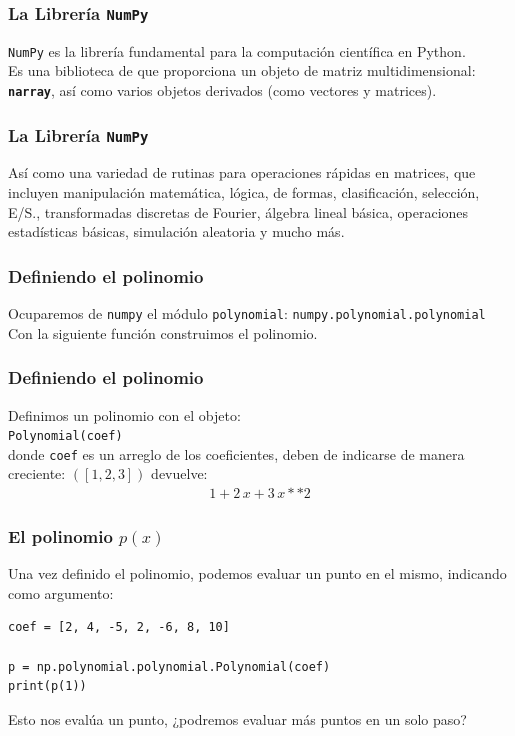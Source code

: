 \documentclass[12pt]{beamer}
\begin{document}
\begin{frame}
\frametitle{La Librería \texttt{NumPy}}
\texttt{NumPy} es la librería fundamental para la computación científica en Python.
\\
\bigskip
\pause
Es una biblioteca de \python{} que proporciona un objeto de matriz multidimensional: \textbf{\texttt{narray}}, así como varios objetos derivados (como vectores y matrices).
\end{frame}
\begin{frame}
\frametitle{La Librería \texttt{NumPy}}
Así como una variedad de rutinas para operaciones rápidas en matrices, que incluyen \pause manipulación matemática, \pause lógica, \pause de formas, \pause clasificación, \pause selección, \pause E/S., \pause transformadas discretas de Fourier, \pause álgebra lineal básica, \pause operaciones estadísticas básicas, \pause simulación aleatoria y mucho más.
\end{frame}
\begin{frame}
\frametitle{Definiendo el polinomio}
Ocuparemos de \texttt{numpy} el módulo \texttt{polynomial}:
{\fontsize{12}{12} \selectfont
\texttt{numpy.polynomial.polynomial}}
\\
\bigskip
\pause
Con la siguiente función construimos el polinomio.
\end{frame}
\begin{frame}
\frametitle{Definiendo el polinomio}
Definimos un polinomio con el objeto:
\\
\pause
{\fontsize{12}{12} \selectfont
\texttt{Polynomial(coef)}}
\\
\pause
donde \texttt{coef} es un arreglo de los coeficientes, deben de indicarse de manera creciente: $([1, 2, 3])$ devuelve:
\pause
\begin{align*}
1 + 2 \, x + 3 \, x**2
\end{align*}
\end{frame}
\begin{frame}[fragile]
\frametitle{El polinomio $p (x)$}
Una vez definido el polinomio, podemos evaluar un punto en el mismo, indicando como argumento:
\pause
\begin{lstlisting}[caption=Definiendo el polinomio p(x)]
coef = [2, 4, -5, 2, -6, 8, 10]

p = np.polynomial.polynomial.Polynomial(coef)
print(p(1))    
\end{lstlisting}
Esto nos evalúa un punto, ¿podremos evaluar más puntos en un solo paso?
\end{frame}
\end{document}
